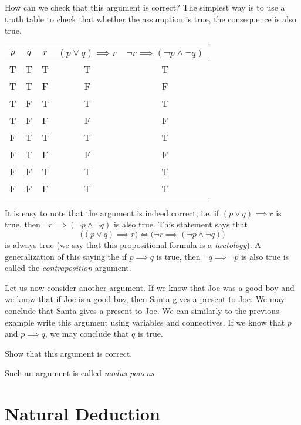 How can we check that this argument is correct? The simplest way is to use a
truth table to check that whether the assumption is true, the consequence is
also true.
\begin{center}
  \begin{tabular}{c | c | c | c | c}
    $p$ & $q$ & $r$ & $(p \lor q) \implies r$ &
      $\lnot r \implies (\lnot p \land \lnot q)$ \\
    \hline
    T & T & T & T & T \\
    T & T & F & F & F \\
    T & F & T & T & T \\
    T & F & F & F & F \\
    F & T & T & T & T \\
    F & T & F & F & F \\
    F & F & T & T & T \\
    F & F & F & T & T
  \end{tabular}
\end{center}
It is easy to note that the argument is indeed correct, i.e.
if $(p \lor q) \implies r$ is true, then
$\lnot r \implies (\lnot p \land \lnot q)$ is also true.
This statement says that
\[
  \bigl((p \lor q) \implies r\bigr) \iff
  \bigl(\lnot r \implies (\lnot p \land \lnot q) \bigr)
\]
is always true (we say that this propositional formula is a
\emph{tautology}). A generalization of this saying the if $p \implies q$ is
true, then $\lnot q \implies \lnot p$ is also true is called the
\emph{contraposition} argument.

Let us now consider another argument. If we know that Joe was a good boy and we
know that if Joe is a good boy, then Santa gives a present to Joe. We may
conclude that Santa gives a present to Joe. We can similarly to the previous
example write this argument using variables and connectives.
If we know that $p$ and $p \implies q$, we may conclude that $q$ is true.
\begin{exercise}
  Show that this argument is correct.
\end{exercise}
Such an argument is called \emph{modus ponens}.

\section{Natural Deduction}


